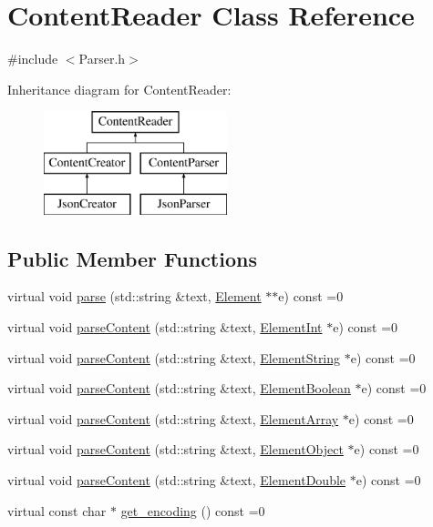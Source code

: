 \hypertarget{classContentReader}{}\section{Content\+Reader Class Reference}
\label{classContentReader}


{\ttfamily \#include $<$Parser.\+h$>$}

Inheritance diagram for Content\+Reader\+:\begin{figure}[H]
\begin{center}
\leavevmode
\includegraphics[height=3.000000cm]{classContentReader}
\end{center}
\end{figure}
\subsection*{Public Member Functions}
\begin{DoxyCompactItemize}
\item 
virtual void \mbox{\hyperlink{classContentReader_a7fff2e63a2e8fa216665604f69974e1d}{parse}} (std\+::string \&text, \mbox{\hyperlink{classElement}{Element}} $\ast$$\ast$e) const =0
\item 
virtual void \mbox{\hyperlink{classContentReader_a7eef37b8b9761e21c0a3907ff94c72f7}{parse\+Content}} (std\+::string \&text, \mbox{\hyperlink{classElementInt}{Element\+Int}} $\ast$e) const =0
\item 
virtual void \mbox{\hyperlink{classContentReader_a310678ddc37a05aca2f13db73b22abe5}{parse\+Content}} (std\+::string \&text, \mbox{\hyperlink{classElementString}{Element\+String}} $\ast$e) const =0
\item 
virtual void \mbox{\hyperlink{classContentReader_a3ee0aec579c723f17742e10fe7c75e39}{parse\+Content}} (std\+::string \&text, \mbox{\hyperlink{classElementBoolean}{Element\+Boolean}} $\ast$e) const =0
\item 
virtual void \mbox{\hyperlink{classContentReader_a91fdd738983dcc7a246c3c163007dfa9}{parse\+Content}} (std\+::string \&text, \mbox{\hyperlink{classElementArray}{Element\+Array}} $\ast$e) const =0
\item 
virtual void \mbox{\hyperlink{classContentReader_a59a8de2bf3436e46b4d029a9b3c3c9da}{parse\+Content}} (std\+::string \&text, \mbox{\hyperlink{classElementObject}{Element\+Object}} $\ast$e) const =0
\item 
virtual void \mbox{\hyperlink{classContentReader_ab4ba739ee5241848ae8af86e64e43a40}{parse\+Content}} (std\+::string \&text, \mbox{\hyperlink{classElementDouble}{Element\+Double}} $\ast$e) const =0
\item 
virtual const char $\ast$ \mbox{\hyperlink{classContentReader_a1495a4402c4fac02d8cd2542b61c6eed}{get\+\_\+encoding}} () const =0
\end{DoxyCompactItemize}



